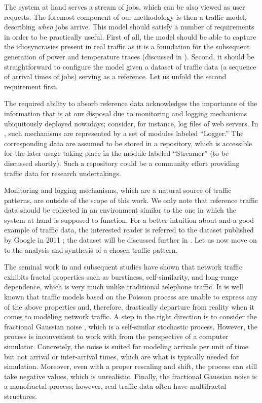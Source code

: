 The system at hand serves a stream of jobs, which can be also viewed as user
requests. The foremost component of our methodology is then a traffic model,
describing \emph{when} jobs arrive. This model should satisfy a number of
requirements in order to be practically useful. First of all, the model should
be able to capture the idiosyncrasies present in real traffic as it is a
foundation for the subsequent generation of power and temperature traces
(discussed in ). Second, it should be straightforward to
configure the model given a dataset of traffic data (a sequence of arrival times
of jobs) serving as a reference. Let us unfold the second requirement first.

The required ability to absorb reference data acknowledges the importance of the
information that is at our disposal due to monitoring and logging mechanisms
ubiquitously deployed nowadays; consider, for instance, log files of web
servers. In , such mechanisms are represented by a set of
modules labeled ``Logger.'' The corresponding data are assumed to be stored in a
repository, which is accessible for the later usage taking place in the module
labeled ``Streamer'' (to be discussed shortly). Such a repository could be a
community effort providing traffic data for research undertakings.

Monitoring and logging mechanisms, which are a natural source of traffic
patterns, are outside of the scope of this work. We only note that reference
traffic data should be collected in an environment similar to the one in which
the system at hand is supposed to function. For a better intuition about and a
good example of traffic data, the interested reader is referred to the dataset
published by Google in 2011 \cite{google}; the dataset will be discussed further
in . Let us now move on to the analysis and synthesis
of a chosen traffic pattern.

The seminal work in \cite{leland1994} and subsequent studies have shown that
network traffic exhibits fractal properties such as burstiness, self-similarity,
and long-range dependence, which is very much unlike traditional telephone
traffic. It is well known that traffic models based on the Poisson process
\cite{lifshits2014} are unable to express any of the above properties and,
therefore, drastically departure from reality when it comes to modeling network
traffic. A step in the right direction is to consider the fractional Gaussian
noise \cite{lifshits2014}, which is a self-similar stochastic process. However,
the process is inconvenient to work with from the perspective of a computer
simulator. Concretely, the noise is suited for modeling arrivals per unit of
time but not arrival or inter-arrival times, which are what is typically needed
for simulation. Moreover, even with a proper rescaling and shift, the process
can still take negative values, which is unrealistic. Finally, the fractional
Gaussian noise is a monofractal process; however, real traffic data often have
multifractal structures.

